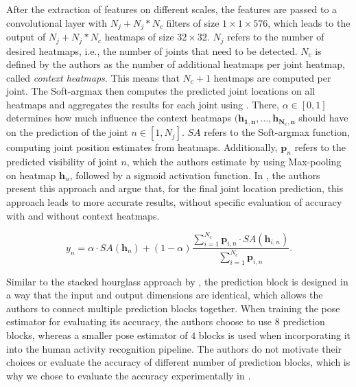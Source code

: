 After the extraction of features on different scales, the features are passed to a convolutional layer with $N_j + N_j * N_c$ filters of size $1 \times 1 \times 576$, which leads to the output of $N_j + N_j * N_c$ heatmaps of size $32 \times 32$.
$N_j$ refers to the number of desired heatmaps, i.e., the number of joints that need to be detected.
$N_c$ is defined by the authors as the number of additional heatmaps per joint heatmap, called \textit{context heatmaps}.
This means that $N_c + 1$ heatmaps are computed per joint.
The Soft-argmax then computes the predicted joint locations on all heatmaps and aggregates the results for each joint using .
There, $\alpha \in [0,1]$ determines how much influence the context heatmaps $(\bm{h_{1,n}}, \dots, \bm{h_{N_c, n}}$ should have on the prediction of the joint $n \in [1, N_j]$.
$SA$ refers to the Soft-argmax function, computing joint position estimates from heatmaps.
Additionally, $\bm{p}_n$ refers to the predicted visibility of joint $n$, which the authors estimate by using Max-pooling on heatmap $\bm{h}_n$, followed by a sigmoid activation function.
In \cite{luvizon_human_2017}, the authors present this approach and argue that, for the final joint location prediction, this approach leads to more accurate results, without specific evaluation of accuracy with and without context heatmaps.

\begin{equation}
    \label{eq:context_sum}
    y_n = \alpha \cdot SA(\bm{h}_n) + (1 - \alpha) \frac{\sum_{i=1}^{N_c} \bm{p}_{i,n} \cdot SA(\bm{h}_{i,n}) }{\sum_{i=1}^{N_c} \bm{p}_{i,n} }.
\end{equation}

Similar to the stacked hourglass approach by \cite{newell_stacked_2016}, the prediction block is designed in a way that the input and output dimensions are identical, which allows the authors to connect multiple prediction blocks together.
When training the pose estimator for evaluating its accuracy, the authors choose to use $8$ prediction blocks, whereas a smaller pose estimator of $4$ blocks is used when incorporating it into the human activity recognition pipeline.
The authors do not motivate their choices or evaluate the accuracy of different number of prediction blocks, which is why we chose to evaluate the accuracy experimentally in .


